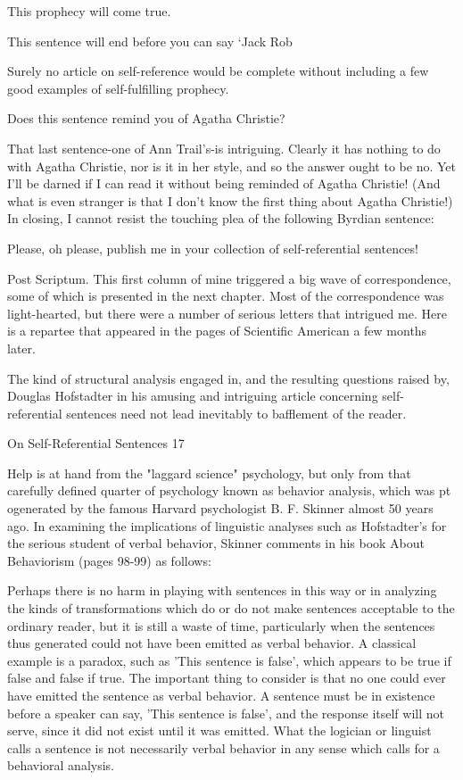    This prophecy will come true.

   This sentence will end before you can say `Jack Rob

   Surely no article on self-reference would be complete without including a few good
     examples of self-fulfilling prophecy.

   Does this sentence remind you of Agatha Christie?

That last sentence-one of Ann Trail's-is intriguing. Clearly it has nothing to do with
Agatha Christie, nor is it in her style, and so the answer ought to be no. Yet I'll be darned
if I can read it without being reminded of Agatha Christie! (And what is even stranger is
that I don't know the first thing about Agatha Christie!)
        In closing, I cannot resist the touching plea of the following Byrdian sentence:

      Please, oh please, publish me in your collection of self-referential sentences!


Post Scriptum.
This first column of mine triggered a big wave of correspondence, some of which is
presented in the next chapter. Most of the correspondence was light-hearted, but there
were a number of serious letters that intrigued me. Here is a repartee that appeared in the
pages of Scientific American a few months later.

           The kind of structural analysis engaged in, and the resulting questions raised
   by, Douglas Hofstadter in his amusing and intriguing article concerning self-
   referential sentences need not lead inevitably to bafflement of the reader.




On Self-Referential Sentences                                                               17

       Help is at hand from the "laggard science" psychology, but only from that
  carefully defined quarter of psychology known as behavior analysis, which was pt
  ogenerated by the famous Harvard psychologist B. F. Skinner almost 50 years ago.
       In examining the implications of linguistic analyses such as Hofstadter's for the
  serious student of verbal behavior, Skinner comments in his book About
  Behaviorism (pages 98-99) as follows:

          Perhaps there is no harm in playing with sentences in this way or in
     analyzing the kinds of transformations which do or do not make sentences
     acceptable to the ordinary reader, but it is still a waste of time, particularly
     when the sentences thus generated could not have been emitted as verbal
     behavior. A classical example is a paradox, such as 'This sentence is false',
     which appears to be true if false and false if true. The important thing to
     consider is that no one could ever have emitted the sentence as verbal
     behavior. A sentence must be in existence before a speaker can say, 'This
     sentence is false', and the response itself will not serve, since it did not exist
     until it was emitted. What the logician or linguist calls a sentence is not
     necessarily verbal behavior in any sense which calls for a behavioral analysis.

